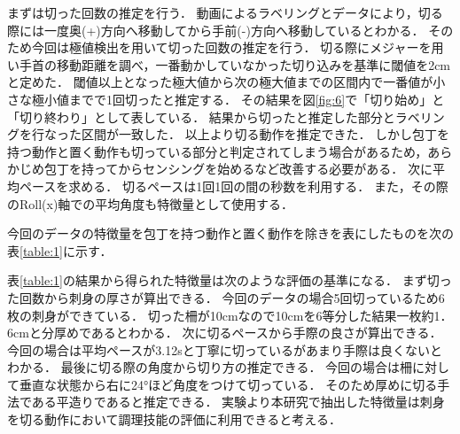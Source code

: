 まずは切った回数の推定を行う．
動画によるラベリングとデータにより，切る際には一度奥(+)方向へ移動してから手前(-)方向へ移動しているとわかる．
そのため今回は極値検出を用いて切った回数の推定を行う．
切る際にメジャーを用い手首の移動距離を調べ，一番動かしていなかった切り込みを基準に閾値を2cmと定めた．
閾値以上となった極大値から次の極大値までの区間内で一番値が小さな極小値までで1回切ったと推定する．
その結果を図\ref{fig:6}で「切り始め」と「切り終わり」として表している．
結果から切ったと推定した部分とラベリングを行なった区間が一致した．
以上より切る動作を推定できた．
しかし包丁を持つ動作と置く動作も切っている部分と判定されてしまう場合があるため，あらかじめ包丁を持ってからセンシングを始めるなど改善する必要がある．
次に平均ペースを求める．
切るペースは1回1回の間の秒数を利用する．
また，その際のRoll(x)軸での平均角度も特徴量として使用する．

今回のデータの特徴量を包丁を持つ動作と置く動作を除きを表にしたものを次の表\ref{table:1}に示す．
\begin{table}[ht]
    \centering
    \caption{特徴量}
    \label{table:1}
\end{table}
表\ref{table:1}の結果から得られた特徴量は次のような評価の基準になる．
まず切った回数から刺身の厚さが算出できる．
今回のデータの場合5回切っているため6枚の刺身ができている．
切った柵が10cmなので10cmを6等分した結果一枚約1．6cmと分厚めであるとわかる．
次に切るペースから手際の良さが算出できる．
今回の場合は平均ペースが3.12sと丁寧に切っているがあまり手際は良くないとわかる．
最後に切る際の角度から切り方の推定できる．
今回の場合は柵に対して垂直な状態から右に24°ほど角度をつけて切っている．
そのため厚めに切る手法である平造りであると推定できる．
実験より本研究で抽出した特徴量は刺身を切る動作において調理技能の評価に利用できると考える．

